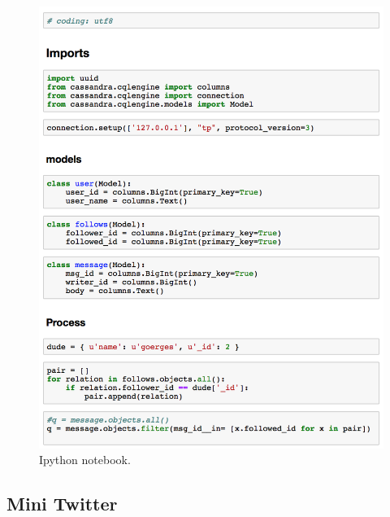 \begin{figure}[ht]

\includegraphics[scale=0.9]{img/ipython.png}
\caption{Ipython notebook.}
\end{figure}

\subsection{Mini Twitter}